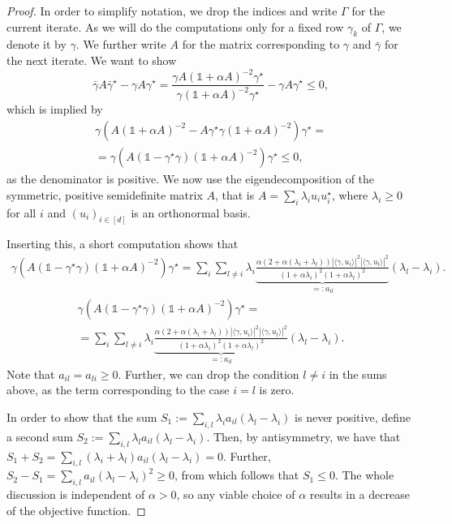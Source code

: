 \documentclass[11pt, onecolumn, journal,compsoc]{IEEEtran}
\newcommand\ip[2]{\langle #1, #2\rangle}
\newcommand\bgamma{\bar\gamma}
\newcommand{\id}{\mathds{1}}
\theoremstyle{plain}
\theoremstyle{remark}
\begin{document}
\begin{proof} In order to simplify notation, we drop the indices and write $\Gamma$ for the current iterate. As we will do the computations only for a fixed row $\gamma_k$ of $\Gamma$, we denote it by $\gamma$. We further write $A$ for the matrix corresponding to $\gamma$ and $\bgamma$ for the next iterate.
We want to show
\[\bgamma A \bgamma^\star - \gamma A\gamma^\star = \frac{\gamma A(\id +\alpha A)^{-2} \gamma^\star}{\gamma (\id +\alpha A)^{-2}\gamma^\star} - \gamma A\gamma^\star\leq0,\]
which is implied by
\ifthenelse{\boolean{onecol}}{
\begin{align*}\gamma(A(\id +\alpha A)^{-2} - A\gamma^\star\gamma (\id +\alpha A)^{-2})\gamma^\star = \gamma (A(\id - \gamma^\star\gamma)(\id +\alpha A)^{-2})\gamma^\star \leq0,\end{align*}}
{\begin{align*}\gamma(A(\id +\alpha A)^{-2} - A\gamma^\star\gamma (\id +\alpha A)^{-2})\gamma^\star =\\= \gamma (A(\id - \gamma^\star\gamma)(\id +\alpha A)^{-2})\gamma^\star \leq0,\end{align*}}
as the denominator is positive. We now use the eigendecomposition of the symmetric, positive semidefinite matrix $A$, that is $A = \sum_i \lambda_i u_i u_i^\star$, where $\lambda_i\geq0$ for all $i$ and $(u_i)_{i\in[d]}$ is an orthonormal basis.

Inserting this, a short computation shows that
{\begin{align*}
\gamma (A(\id - \gamma^\star\gamma)(\id +\alpha A)^{-2})\gamma^\star = \sum_i \sum_{l\neq i} \lambda_i\underbrace{\frac{\alpha (2+\alpha(\lambda_i+\lambda_l))|\ip{\gamma}{u_i}|^2|\ip{\gamma}{u_l}|^2}{(1+\alpha \lambda_i)^2(1+\alpha\lambda_l)^2}}_{=:a_{il}}(\lambda_l-\lambda_i).
\end{align*}}
{
\begin{multline*}
	\gamma (A(\id - \gamma^\star\gamma)(\id +\alpha A)^{-2})\gamma^\star =\\= \sum_i \sum_{l\neq i} \lambda_i\underbrace{\tfrac{\alpha (2+\alpha(\lambda_i+\lambda_l))|\ip{\gamma}{u_i}|^2|\ip{\gamma}{u_l}|^2}{(1+\alpha \lambda_i)^2(1+\alpha\lambda_l)^2}}_{=:a_{il}}(\lambda_l-\lambda_i).
	\end{multline*}}
Note that $a_{il} = a_{li}\geq0$. Further, we can drop the condition $l\neq i$ in the sums above, as the term corresponding to the case $i=l$ is zero.

In order to show that the sum $S_1:= \sum_{i,l} \lambda_i a_{il}(\lambda_l - \lambda_i)$ is never positive, define a second sum $S_2 := \sum_{i,l} \lambda_l a_{il}(\lambda_l - \lambda_i)$. Then, by antisymmetry, we have that $S_1+S_2 = \sum_{i,l} (\lambda_i+\lambda_l) a_{il}(\lambda_l - \lambda_i) = 0$. 
Further, $S_2 -S_1= \sum_{i,l} a_{il}(\lambda_l - \lambda_i)^2\geq0$, from which follows that $S_1\leq 0$. The whole discussion is independent of $\alpha>0$, so any viable choice of $\alpha$ results in a decrease of the objective function.


\end{proof}
\end{document}
